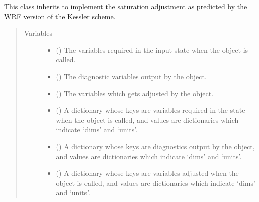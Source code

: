 \documentclass[letterpaper,10pt,english]{sphinxmanual}
\begin{document}

\begin{fulllineitems}
\label{\detokenize{api:parameterizations.adjustment_microphysics_kessler_wrf_saturation.AdjustmentMicrophysicsKesslerWRFSaturation}}
This class inherits 
to implement the saturation adjustment as predicted by the WRF version of the Kessler scheme.
\begin{quote}\begin{description}
\item[{Variables}] \leavevmode\begin{itemize}
\item {} 
 () \textendash{} The variables required in the input state when the object is called.

\item {} 
 () \textendash{} The diagnostic variables output by the object.

\item {} 
 () \textendash{} The variables which gets adjusted by the object.

\item {} 
 () \textendash{} A dictionary whose keys are variables required in the state when the object is called,
and values are dictionaries which indicate ‘dims’ and ‘units’.

\item {} 
 () \textendash{} A dictionary whose keys are diagnostics output by the object,
and values are dictionaries which indicate ‘dims’ and ‘units’.

\item {} 
 () \textendash{} A dictionary whose keys are variables adjusted when the object is called,
and values are dictionaries which indicate ‘dims’ and ‘units’.


\end{itemize}
\end{description}
\end{quote}
\end{fulllineitems}
\end{document}
